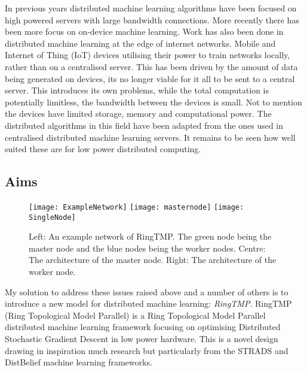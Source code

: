 In previous years distributed machine learning algorithms have been focused on
high powered servers with large bandwidth connections. More recently there has
been more focus on on-device machine learning. Work has also been done in
distributed machine learning at the edge of internet networks.
\cite{konevcny2016federated, wang2018EdgeLearning} Mobile and Internet of Thing
(IoT) devices utilising their power to train networks locally, rather than on a
centralised server. This has been driven by the amount of data being generated
on devices, its no longer viable for it all to be sent to a central server.
\cite{Chaing2016FogIoT} This introduces its own problems, while the total
computation is potentially limitless, the bandwidth between the devices is
small. Not to mention the devices have limited storage, memory and computational
power. The distributed algorithms in this field have been adapted from the ones
used in centralised distributed machine learning servers. It remains to be seen
how well suited these are for low power distributed computing.


\subsection{Aims}

\begin{figure}[h]
    \texttt{[image: ExampleNetwork]}
    \texttt{[image: masternode]}
    \texttt{[image: SingleNode]}
    \caption{
            Left: An example network of RingTMP. The green node being the master node and the blue nodes being the worker nodes.
            Centre: The architecture of the master node.
            Right: The architecture of the worker node.
        }
\end{figure}

My solution to address these issues raised above and a number of others is to
introduce a new model for distributed machine learning: \textit{RingTMP}.
RingTMP (Ring Topological Model Parallel) is a Ring Topological Model Parallel
distributed machine learning framework focusing on optimising Distributed
Stochastic Gradient Descent in low power hardware. This is a novel design
drawing in inspiration much research but particularly from the STRADS and
DistBelief machine learning frameworks. \cite{kim2016STRADS,Dean2012Distbelief}

